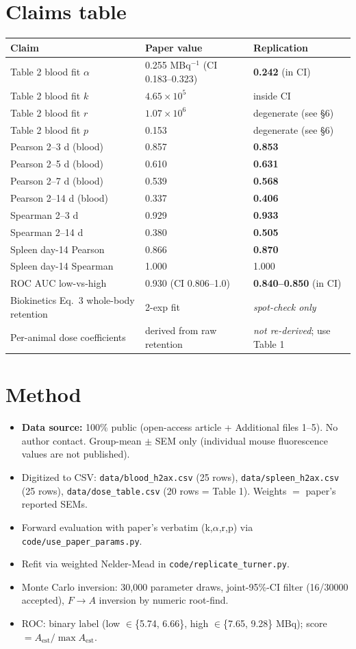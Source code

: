 \documentclass[11pt]{article}
\begin{document}
\section{Claims table}
\begin{longtable}{p{6cm} p{3.5cm} p{4cm}}
\toprule
Claim & Paper value & Replication \\
\midrule
Table 2 blood fit $\alpha$ & 0.255 MBq$^{-1}$ (CI 0.183--0.323) & \textbf{0.242} (in CI) \\
Table 2 blood fit $k$ & $4.65{\times}10^{5}$ & inside CI \\
Table 2 blood fit $r$ & $1.07{\times}10^{6}$ & degenerate (see \S6) \\
Table 2 blood fit $p$ & 0.153 & degenerate (see \S6) \\
Pearson 2--3 d (blood) & 0.857 & \textbf{0.853} \\
Pearson 2--5 d (blood) & 0.610 & \textbf{0.631} \\
Pearson 2--7 d (blood) & 0.539 & \textbf{0.568} \\
Pearson 2--14 d (blood) & 0.337 & \textbf{0.406} \\
Spearman 2--3 d & 0.929 & \textbf{0.933} \\
Spearman 2--14 d & 0.380 & \textbf{0.505} \\
Spleen day-14 Pearson & 0.866 & \textbf{0.870} \\
Spleen day-14 Spearman & 1.000 & 1.000 \\
ROC AUC low-vs-high & 0.930 (CI 0.806--1.0) & \textbf{0.840--0.850} (in CI) \\
Biokinetics Eq.~3 whole-body retention & 2-exp fit & \emph{spot-check only} \\
Per-animal dose coefficients & derived from raw retention & \emph{not re-derived}; use Table 1 \\
\bottomrule
\end{longtable}

\section{Method}
\begin{itemize}
\item \textbf{Data source:} 100\% public (open-access article + Additional
files 1--5). No author contact. Group-mean $\pm$ SEM only (individual
mouse fluorescence values are not published).
\item Digitized to CSV: \texttt{data/blood\_h2ax.csv} (25 rows),
\texttt{data/spleen\_h2ax.csv} (25 rows), \texttt{data/dose\_table.csv}
(20 rows = Table 1). Weights $=$ paper's reported SEMs.
\item Forward evaluation with paper's verbatim (k,$\alpha$,r,p) via
\texttt{code/use\_paper\_params.py}.
\item Refit via weighted Nelder-Mead in \texttt{code/replicate\_turner.py}.
\item Monte Carlo inversion: 30{,}000 parameter draws, joint-95\%-CI
filter (16/30000 accepted), $F\to A$ inversion by numeric root-find.
\item ROC: binary label (low $\in$\{5.74, 6.66\}, high $\in$\{7.65, 9.28\}
MBq); score $= A_{\mathrm{est}}/\max A_{\mathrm{est}}$.
\end{itemize}
\end{document}
